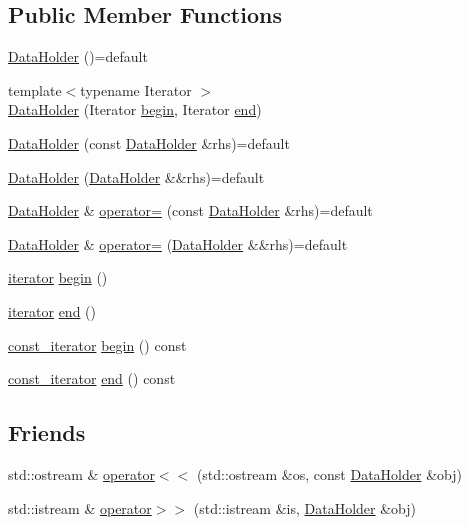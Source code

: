 \subsection*{Public Member Functions}
\begin{DoxyCompactItemize}
\item 
\hyperlink{classDataHolder_af76f72449ab22dafc1efa03084b525e5}{Data\+Holder} ()=default
\item 
{\footnotesize template$<$typename Iterator $>$ }\\\hyperlink{classDataHolder_a407d59793678968e1e4803bceeac9df5}{Data\+Holder} (Iterator \hyperlink{classDataHolder_a73bdc9101084dd53b22fdb40c877d10b}{begin}, Iterator \hyperlink{classDataHolder_a082001b8e93cf0aa1500677e4156b618}{end})
\item 
\hyperlink{classDataHolder_a62ed6b152862e8b9572187807640c586}{Data\+Holder} (const \hyperlink{classDataHolder}{Data\+Holder} \&rhs)=default
\item 
\hyperlink{classDataHolder_a6d1fdef9552e75f93c0174ec35a2fd57}{Data\+Holder} (\hyperlink{classDataHolder}{Data\+Holder} \&\&rhs)=default
\item 
\hyperlink{classDataHolder}{Data\+Holder} \& \hyperlink{classDataHolder_a3034e2aa41d6dfefcf4e60cc76bc555b}{operator=} (const \hyperlink{classDataHolder}{Data\+Holder} \&rhs)=default
\item 
\hyperlink{classDataHolder}{Data\+Holder} \& \hyperlink{classDataHolder_a16dcf3489a359c8f9c172f5178c6776f}{operator=} (\hyperlink{classDataHolder}{Data\+Holder} \&\&rhs)=default
\item 
\hyperlink{classDataHolder_adecdb7b6c101d8ce9815c2ee2a4596b2}{iterator} \hyperlink{classDataHolder_a73bdc9101084dd53b22fdb40c877d10b}{begin} ()
\item 
\hyperlink{classDataHolder_adecdb7b6c101d8ce9815c2ee2a4596b2}{iterator} \hyperlink{classDataHolder_a082001b8e93cf0aa1500677e4156b618}{end} ()
\item 
\hyperlink{classDataHolder_a6284772630d15867fe5549a2903944cd}{const\+\_\+iterator} \hyperlink{classDataHolder_a05afb99b3d1ea784b415bae839e1c4c5}{begin} () const
\item 
\hyperlink{classDataHolder_a6284772630d15867fe5549a2903944cd}{const\+\_\+iterator} \hyperlink{classDataHolder_a57f9f124e39a09c87bdc789fa376cb56}{end} () const
\end{DoxyCompactItemize}
\subsection*{Friends}
\begin{DoxyCompactItemize}
\item 
std\+::ostream \& \hyperlink{classDataHolder_a0f981cce0bcb94e5ad04cd86a520d5bb}{operator$<$$<$} (std\+::ostream \&os, const \hyperlink{classDataHolder}{Data\+Holder} \&obj)
\item 
std\+::istream \& \hyperlink{classDataHolder_ab300a1908af5ffa17e2106ce4d996fb6}{operator$>$$>$} (std\+::istream \&is, \hyperlink{classDataHolder}{Data\+Holder} \&obj)
\end{DoxyCompactItemize}


